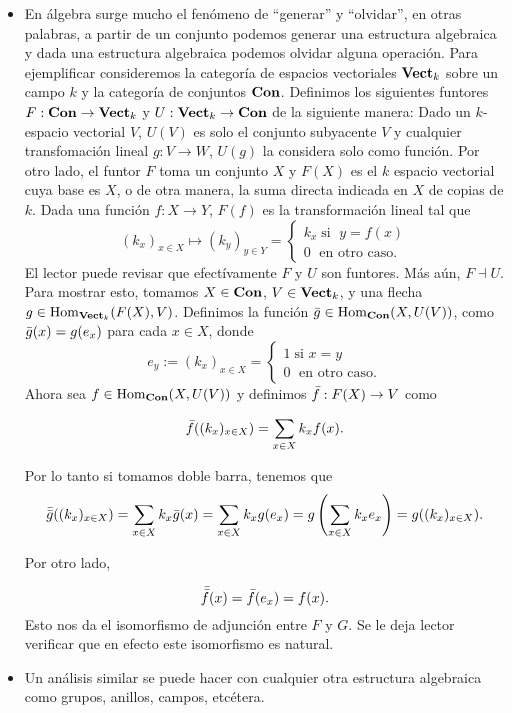 \documentclass{comunicaciones}
\begin{document}
\begin{ej}
	\begin{itemize}
		\item En álgebra surge mucho el fen\'omeno de ``generar'' y ``olvidar'', en otras palabras, a partir de un conjunto podemos generar una estructura algebraica y dada una estructura algebraica podemos olvidar alguna operaci\'on. Para ejemplificar consideremos la categoría de espacios vectoriales $\mathbf{Vect}_k$ sobre un campo $k$ y la categoría de conjuntos $\mathbf{Con}$. Definimos los siguientes funtores $F:\mathbf{Con}\to\mathbf{Vect}_k$ y $U:\mathbf{Vect}_k\to\mathbf{Con}$ de la siguiente manera:
		Dado un $k$-espacio vectorial $V$, $U(V)$ es solo el conjunto subyacente $V$ y cualquier transfomaci\'on lineal $g:V\to W$, $U(g)$ la considera solo como funci\'on. Por otro lado, el funtor $F$ toma un conjunto $X$ y $F(X)$ es el $k$ espacio vectorial cuya base es $X$, o de otra manera, la suma directa indicada en $X$ de copias de $k$. Dada una funci\'on $f:X\to Y$, $F(f)$ es la transformaci\'on lineal tal que 
		\[(k_x)_{x\in X}\mapsto (k_y)_{y\in Y}=\begin{cases}
			k_x \; \text{si }\; y=f(x) \\
			0 \;\text{ en otro caso.}
		\end{cases}\]
		El lector puede revisar que efect\'ivamente $F$ y $U$ son funtores. M\'as a\'un, $F\dashv U$. Para mostrar esto, tomamos $X\in\mathbf{Con}$, $V\in\mathbf{Vect}_k$, y una flecha $g\in\mathrm{Hom}_{\mathbf{Vect}_k}(F(X),V)$. Definimos la funci\'on $\Bar{g}\in\mathrm{Hom}_{\mathbf{Con}}(X,U(V))$, como $\Bar{g}(x)=g(e_x)$ para cada $x\in X$, donde 
		\[e_y:=(k_x)_{x\in X}=\begin{cases}
			1 \;\text{si } x=y \\
			0 \;\text{ en otro caso.} 
		\end{cases}\]
		Ahora sea $f\in\mathrm{Hom}_{\mathbf{Con}}(X,U(V))$ y definimos $\Bar{f}:F(X)\to V$ como 
		
		\[\Bar{f}((k_x)_{x\in X})=\sum_{x\in X} k_xf(x).\]
		
		Por lo tanto si tomamos doble barra, tenemos que 
		\[\Bar{\Bar{g}}((k_x)_{x\in X})=\sum_{x\in X} k_x\Bar{g}(x)=\sum_{x\in X} k_xg(e_x)=g\left(\sum_{x\in X}k_xe_x\right)=g((k_x)_{x\in X}).\]
		
		Por otro lado,
		
		\[\Bar{\Bar{f}}(x)=\Bar{f}(e_x)=f(x).\]
		Esto nos da el isomorfismo de adjunci\'on entre $F$ y $G$. Se le deja lector verificar que en efecto este isomorfismo es natural.
		
		
		\item Un an\'alisis similar se puede hacer con cualquier otra estructura algebraica como grupos, anillos, campos, etc\'etera.
		

\end{itemize}
\end{ej}
\end{document}
